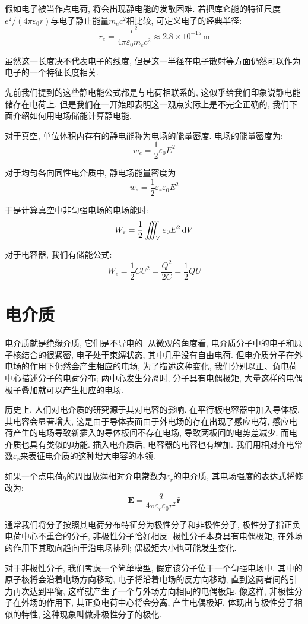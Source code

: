 假如电子被当作点电荷, 将会出现静电能的发散困难. 若把库仑能的特征尺度$e^2/(4\pi\varepsilon_0r)$与电子静止能量$m_ec^2$相比较, 可定义电子的经典半径:
\[
r_e=\frac{e^2}{4\pi\varepsilon_0m_e c^2}\approx 2.8\times10^{-15}\,\mathrm{m}
\]

虽然这一长度决不代表电子的线度, 但是这一半径在电子散射等方面仍然可以作为电子的一个特征长度相关.

先前我们提到的这些静电能公式都是与电荷相联系的, 这似乎给我们印象说静电能储存在电荷上. 但是我们在一开始即表明这一观点实际上是不完全正确的, 我们下面介绍如何用电场储能计算静电能.

对于真空, 单位体积内存有的静电能称为电场的能量密度. 电场的能量密度为:
\[
w_e=\frac{1}{2}\varepsilon_0E^2
\]

对于均匀各向同性电介质中, 静电场能量密度为
\[
w_e=\frac{1}{2}\varepsilon_r\varepsilon_0E^2
\]

于是计算真空中非匀强电场的电场能时:
\[
W_e = \frac{1}{2} \iiint_V \varepsilon_0 E^2 \mathop{}\!\mathrm{d} V
\]

对于电容器, 我们有储能公式:
\[
W_e=\frac{1}{2}CU^2 = \frac{Q^2}{2C} = \frac{1}{2}QU
\]

\section{电介质}
电介质就是绝缘介质, 它们是不导电的. 从微观的角度看, 电介质分子中的电子和原子核结合的很紧密, 电子处于束缚状态, 其中几乎没有自由电荷. 但电介质分子在外电场的作用下仍然会产生相应的电场, 为了描述这种变化, 我们分别以正、负电荷中心描述分子的电荷分布; 两中心发生分离时, 分子具有电偶极矩, 大量这样的电偶极子叠加就可以产生相应的电场.

历史上, 人们对电介质的研究源于其对电容的影响. 在平行板电容器中加入导体板, 其电容会显著增大, 这是由于导体表面由于外电场的存在出现了感应电荷, 感应电荷产生的电场导致新插入的导体板间不存在电场, 导致两板间的电势差减少. 而电介质也具有类似的功能. 插入电介质后, 电容器的电容也有增加. 我们用相对介电常数$\varepsilon_r$来表征电介质的这种增大电容的本领.

如果一个点电荷$q$的周围放满相对介电常数为$\varepsilon_r$的电介质, 其电场强度的表达式将修改为:
\[
\mathbf{E}=\frac{q}{4\pi\varepsilon_r\varepsilon_0r^2}\hat{\mathbf{r}}
\]

通常我们将分子按照其电荷分布特征分为极性分子和非极性分子, 极性分子指正负电荷中心不重合的分子, 非极性分子恰好相反. 极性分子本身具有电偶极矩, 在外场的作用下其取向趋向于沿电场排列; 偶极矩大小也可能发生变化.

对于非极性分子, 我们考虑一个简单模型, 假定该分子位于一个匀强电场中. 其中的原子核将会沿着电场方向移动, 电子将沿着电场的反方向移动, 直到这两者间的引力再次达到平衡, 这样就产生了一个与外场方向相同的电偶极矩. 像这样, 非极性分子在外场的作用下, 其正负电荷中心将会分离, 产生电偶极矩, 体现出与极性分子相似的特性, 这种现象叫做非极性分子的极化.

